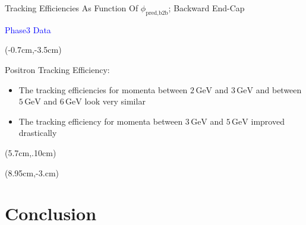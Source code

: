 \documentclass[8pt]{beamer}
\begin{document}
\begin{frame}{Tracking Efficiencies As Function Of $\phi_{\textrm{pred,b2b}}$; Backward End-Cap}
\begin{textblock*}{4cm}
		\textcolor{blue}{Phase3 Data}
	\end{textblock*}
	
	
	
	\begin{textblock*}{6cm}(-0.7cm,-3.5cm)
		
		
			\begin{mybox}
				Positron Tracking Efficiency:
				\begin{itemize}					
					\item The tracking efficiencies for momenta between $2\,\textrm{GeV}$ and $3\,\textrm{GeV}$ and between $5\,\textrm{GeV}$ and $6\,\textrm{GeV}$ look very similar
					
					\item<2,3> The tracking efficiency for momenta between $3\,\textrm{GeV}$ and $5\,\textrm{GeV}$ improved drastically 
				\end{itemize}
			\end{mybox}
		
	\end{textblock*}
	
	
	
			\begin{textblock*}{5cm}(5.7cm,.10cm)
	\end{textblock*}
	
	
	
	\begin{textblock*}{5cm}(8.95cm,-3.cm)
	\end{textblock*}
	
	
	
	
	
	\pause[3]
	
	
	
	
	
	
\end{frame}



\section{Conclusion}
{
	\begin{frame}[noframenumbering]
		\sectionpage
	\end{frame}
}
\end{document}
